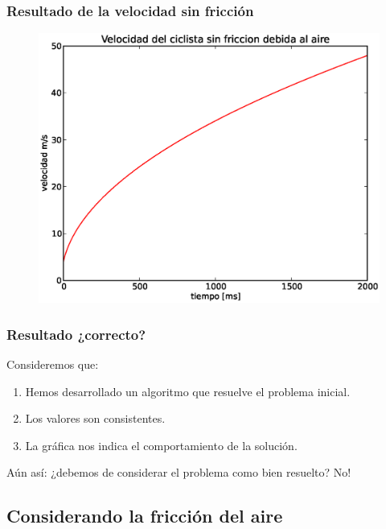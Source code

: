 \documentclass[12pt]{beamer}
\begin{document}
\begin{frame}
\frametitle{Resultado de la velocidad sin fricción}
\begin{figure}[H]
	\centering
	\includegraphics[scale=0.475]{Imagenes/EjerBicicleta01.eps}
\end{figure}
\end{frame}
\begin{frame}
\frametitle{Resultado ¿correcto?}
Consideremos que:
\begin{enumerate}[<+->]
\item Hemos desarrollado un algoritmo que resuelve el problema inicial.
\item Los valores son consistentes.
\item La gráfica nos indica el comportamiento de la solución.
\end{enumerate}
\pause
Aún así: ¿debemos de considerar el problema como bien resuelto? \pause \textcolor{auburn}{No!}
\end{frame}

\subsection{Considerando la fricción del aire}
\end{document}
